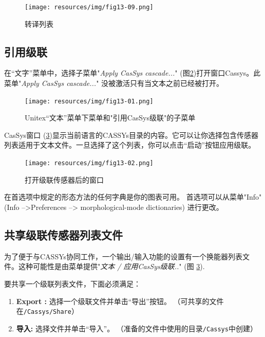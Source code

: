 \begin{figure}[!htb]
  \centering
  \texttt{[image: resources/img/fig13-09.png]}
  \caption{转译列表}
  \label{fig13-09}
\end{figure}

	

\subsection{引用级联}
\label{subsec:launchCascade}

在“文字”菜单中，选择子菜单"\textit{Apply CasSys cascade...}" (图\ref{fig13-01})打开窗口Cassys。此菜单"\textit{Apply CasSys cascade...}" 没被激活只有当文本之前已经被打开。
\begin{figure}[!htb]
 \centering
 \texttt{[image: resources/img/fig13-01.png]}
 \caption{Unitex“文本”菜单下菜单和"引用CasSys级联"的子菜单}
 \label{fig13-01}
\end{figure}

CasSys窗口 (\ref{fig13-02})显示当前语言的CASSYs目录的内容。它可以让你选择包含传感器列表适用于文本文件。一旦选择了这个列表，你可以点击“启动”按钮应用级联。

\begin{figure}[!htb]
  \centering
  \texttt{[image: resources/img/fig13-02.png]}
  \caption{打开级联传感器后的窗口}
  \label{fig13-02}
\end{figure}

在首选项中规定的形态方法的任何字典是你的图表可用。
首选项可以从菜单"Info" (Info -->Preferences --> morphological-mode dictionaries) 进行更改。

\subsection{共享级联传感器列表文件}
\label{subsec:shareCascade}

为了便于与CASSYs协同工作，一个输出/输入功能的设置有一个换能器列表文件。这种可能性是由菜单提供"\textit{文本 / 应用CasSys级联..}" (图 \ref{fig13-02}).

要共享一个级联列表文件，下面必须满足：
\begin{enumerate}
\item \textbf{Export :} 选择一个级联文件并单击“导出”按钮。 （可共享的文件在\texttt{/Cassys/Share}）
\item \textbf{导入:} 选择文件并单击“导入”。
（准备的文件中使用的目录\texttt{/Cassys}中创建）
\end{enumerate}

